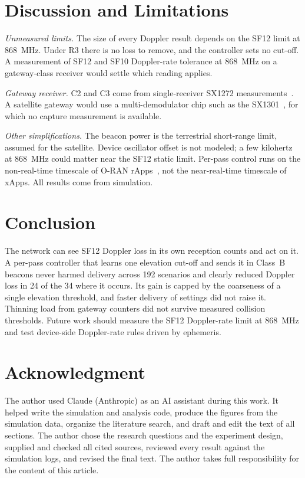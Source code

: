 \documentclass[journal]{IEEEtran}
\begin{document}
\section{Discussion and Limitations}\label{sec:discussion}
\emph{Unmeasured limits.} The size of every Doppler result depends on the SF12 limit at 868~MHz. Under R3 there is no loss to remove, and the controller sets no cut-off. A measurement of SF12 and SF10 Doppler-rate tolerance at 868~MHz on a gateway-class receiver would settle which reading applies.

\emph{Gateway receiver.} C2 and C3 come from single-receiver SX1272 measurements~\cite{croce2018,bor2016}. A satellite gateway would use a multi-demodulator chip such as the SX1301~\cite{sx1301}, for which no capture measurement is available.

\emph{Other simplifications.} The beacon power is the terrestrial short-range limit, assumed for the satellite. Device oscillator offset is not modeled; a few kilohertz at 868~MHz could matter near the SF12 static limit. Per-pass control runs on the non-real-time timescale of O-RAN rApps~\cite{tarchi2026}, not the near-real-time timescale of xApps. All results come from simulation.

\section{Conclusion}
The network can see SF12 Doppler loss in its own reception counts and act on it. A per-pass controller that learns one elevation cut-off and sends it in Class~B beacons never harmed delivery across 192 scenarios and clearly reduced Doppler loss in 24 of the 34 where it occurs. Its gain is capped by the coarseness of a single elevation threshold, and faster delivery of settings did not raise it. Thinning load from gateway counters did not survive measured collision thresholds. Future work should measure the SF12 Doppler-rate limit at 868~MHz and test device-side Doppler-rate rules driven by ephemeris.

\section*{Acknowledgment}
The author used Claude (Anthropic) as an AI assistant during this work. It helped write the simulation and analysis code, produce the figures from the simulation data, organize the literature search, and draft and edit the text of all sections. The author chose the research questions and the experiment design, supplied and checked all cited sources, reviewed every result against the simulation logs, and revised the final text. The author takes full responsibility for the content of this article.
\end{document}
